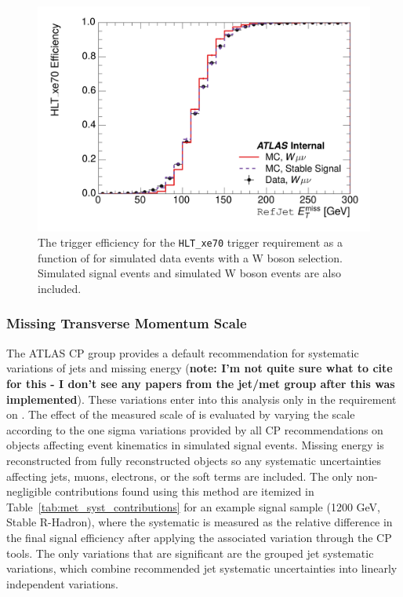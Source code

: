 \begin{figure}[h]
\centering
\includegraphics[width=\fullfig]{figures/hlt_xe70_calomet.png}
\caption{The trigger efficiency for the \texttt{HLT\_xe70} trigger requirement as a function of \calomet for simulated data events with a W boson selection. Simulated signal events and simulated W boson events are also included.}
\label{fig:trigger_turnon_calo}
\end{figure}

\subsubsection{Missing Transverse Momentum Scale}

The \ac{ATLAS} \ac{CP} group provides a default recommendation for systematic variations of jets and missing energy (\textbf{note: I'm not quite sure what to cite for this - I don't see any papers from the jet/met group after this was implemented}). These variations enter into this analysis only in the requirement on \met. The effect of the measured scale of \met is evaluated by varying the \met scale according to the one sigma variations provided by all \ac{CP} recommendations on objects affecting event kinematics in simulated signal events. Missing energy is reconstructed from fully reconstructed objects so any systematic uncertainties affecting jets, muons, electrons, or the \met soft terms are included. The only non-negligible contributions found using this method are itemized in Table~\ref{tab:met_syst_contributions} for an example signal sample (1200 GeV, Stable R-Hadron), where the systematic is measured as the relative difference in the final signal efficiency after applying the associated variation through the CP tools. The only variations that are significant are the grouped jet systematic variations, which combine recommended jet systematic uncertainties into linearly independent variations. 

